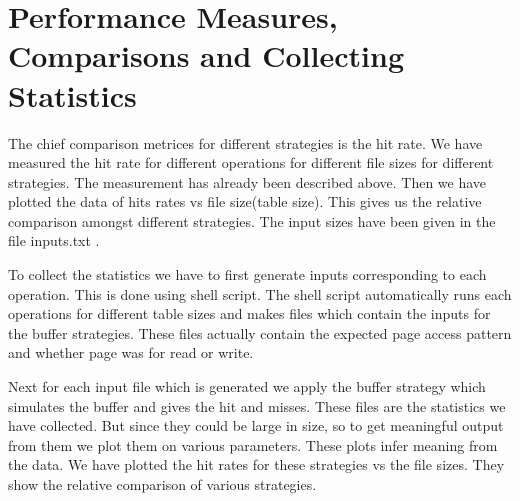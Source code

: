 \section*{{Performance Measures, Comparisons and Collecting Statistics}}

The chief comparison metrices for different strategies is the hit rate. We have measured the hit rate for different operations for different file sizes for different strategies. The measurement has already been described above. Then we have plotted the data of hits rates vs file size(table size). This gives us the relative comparison amongst different strategies. The input sizes have been given in the file inputs.txt .

To collect the statistics we have to first generate inputs corresponding to each operation. This is done using shell script. The shell script automatically runs each operations for different table sizes and makes files which contain the inputs for the buffer strategies. These files actually contain the expected page access pattern and whether page was for read or write.

Next for each input file which is generated we apply the buffer strategy which simulates the buffer and gives the hit and misses.  These files are the statistics we have collected. But since they could be large in size, so to get meaningful output from them we plot them on various parameters. These plots infer meaning from the data. We have plotted the hit rates for these strategies vs the file sizes. They show the relative comparison of various strategies.


